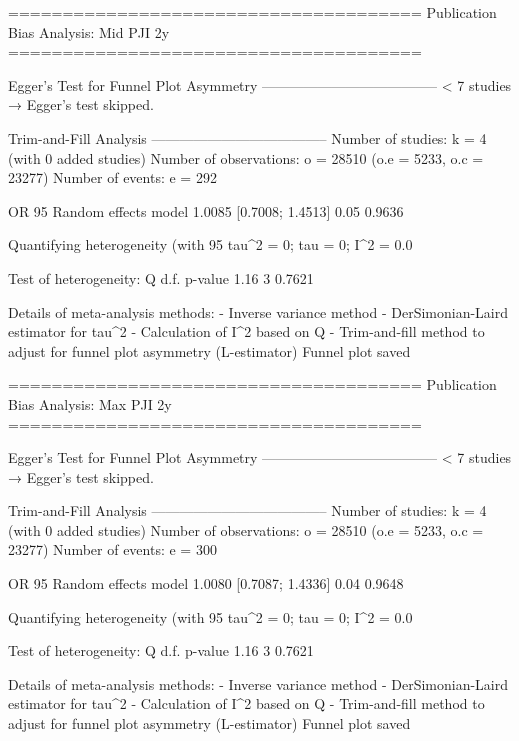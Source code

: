 ======================================
Publication Bias Analysis: Mid PJI 2y 
======================================
                                                                                                                                                          
Egger's Test for Funnel Plot Asymmetry
--------------------------------------
  < 7 studies → Egger’s test skipped.

Trim-and-Fill Analysis
--------------------------------------
Number of studies: k = 4 (with 0 added studies)
Number of observations: o = 28510 (o.e = 5233, o.c = 23277)
Number of events: e = 292

                         OR           95%
Random effects model 1.0085 [0.7008; 1.4513] 0.05  0.9636

Quantifying heterogeneity (with 95%
 tau^2 = 0; tau = 0; I^2 = 0.0%

Test of heterogeneity:
    Q d.f. p-value
 1.16    3  0.7621

Details of meta-analysis methods:
- Inverse variance method
- DerSimonian-Laird estimator for tau^2
- Calculation of I^2 based on Q
- Trim-and-fill method to adjust for funnel plot asymmetry (L-estimator)
  Funnel plot saved

======================================
Publication Bias Analysis: Max PJI 2y 
======================================
                                                                                                                                                          
Egger's Test for Funnel Plot Asymmetry
--------------------------------------
  < 7 studies → Egger’s test skipped.

Trim-and-Fill Analysis
--------------------------------------
Number of studies: k = 4 (with 0 added studies)
Number of observations: o = 28510 (o.e = 5233, o.c = 23277)
Number of events: e = 300

                         OR           95%
Random effects model 1.0080 [0.7087; 1.4336] 0.04  0.9648

Quantifying heterogeneity (with 95%
 tau^2 = 0; tau = 0; I^2 = 0.0%

Test of heterogeneity:
    Q d.f. p-value
 1.16    3  0.7621

Details of meta-analysis methods:
- Inverse variance method
- DerSimonian-Laird estimator for tau^2
- Calculation of I^2 based on Q
- Trim-and-fill method to adjust for funnel plot asymmetry (L-estimator)
  Funnel plot saved

